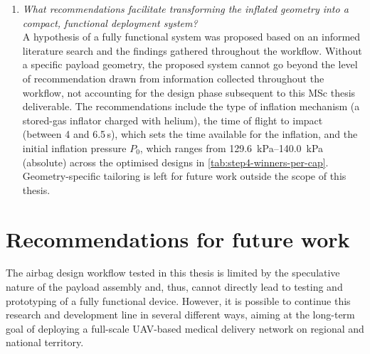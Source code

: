 \begin{enumerate}
  \item \textit{What recommendations facilitate transforming the inflated geometry into a compact, functional deployment system?}\\
  A hypothesis of a fully functional system was proposed based on an informed literature search and the findings gathered throughout the workflow. Without a specific payload geometry, the proposed system cannot go beyond the level of recommendation drawn from information collected throughout the workflow, not accounting for the design phase subsequent to this MSc thesis deliverable. The recommendations include the type of inflation mechanism (a stored-gas inflator charged with helium), the time of flight to impact (between 4 and 6.5\,s), which sets the time available for the inflation, and the initial inflation pressure $P_0$, which ranges from \qtyrange{129.6}{140.0}{\kilo\pascal} (absolute) across the optimised designs in \cref{tab:step4-winners-per-cap}. Geometry-specific tailoring is left for future work outside the scope of this thesis. 
\end{enumerate}

\section{Recommendations for future work}
The airbag design workflow tested in this thesis is limited by the speculative nature of the payload assembly and, thus, cannot directly lead to testing and prototyping of a fully functional device. However, it is possible to continue this research and development line in several different ways, aiming at the long-term goal of deploying a full-scale UAV-based medical delivery network on regional and national territory. 


